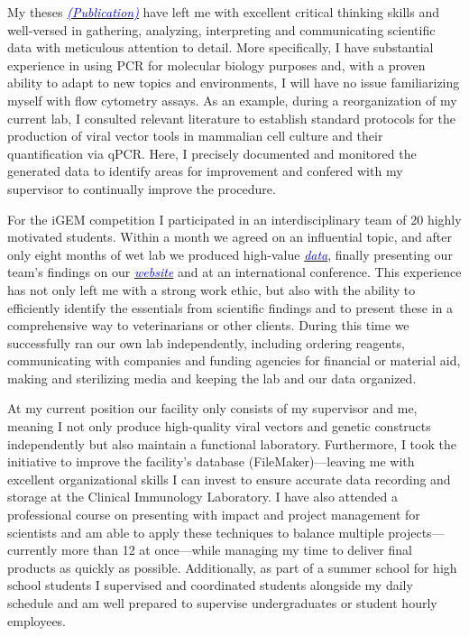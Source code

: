 \documentclass[11pt,a4paper,sans]{moderncv}
\begin{document}
\begin{spacing}{1.1}
My theses {\href{https://www.ncbi.nlm.nih.gov/pubmed/29517395}{\textcolor{blue}{{\textit{(Publication)}}}}} have left me with excellent critical thinking skills and well-versed in gathering, analyzing, interpreting and communicating scientific data with meticulous attention to detail. 
More specifically, I have substantial experience in using PCR for molecular biology purposes and, with a proven ability to adapt to new topics and environments, I will have no issue familiarizing myself with flow cytometry assays. 
As an example, during a reorganization of my current lab, I consulted relevant literature to establish standard protocols for the production of viral vector tools in mammalian cell culture and their quantification via qPCR. 
Here, I precisely documented and monitored the generated data to identify areas for improvement and confered with my supervisor to continually improve the procedure. \par%
For the iGEM competition I participated in an interdisciplinary team of 20 highly motivated students.
Within a month we agreed on an influential topic, and after only eight months of wet lab we produced high-value  {\href{https://www.ncbi.nlm.nih.gov/pubmed/29803867}{\textcolor{blue}{\textit{data}}}}, finally presenting our team's findings on our {\href{http://2015.igem.org/Team:Freiburg}{\textcolor{blue}{\textit{website}}}} and at an international conference. 
This experience has not only left me with a strong work ethic, but also with the ability to efficiently identify the essentials from scientific findings and to present these in a comprehensive way to veterinarians or other clients. 
During this time we successfully ran our own lab independently, including ordering reagents, communicating with companies and funding agencies for financial or material aid, making and sterilizing media and keeping the lab and our data organized. \par 
At my current position our facility only consists of my supervisor and me, meaning I not only produce high-quality viral vectors and genetic constructs independently but also maintain a functional laboratory. 
Furthermore, I took the initiative to improve the facility's database (FileMaker)---leaving me with excellent organizational skills I can invest to ensure accurate data recording and storage at the Clinical Immunology Laboratory.  
I have also attended a professional course on presenting with impact and project management for scientists and am able to apply these techniques to balance multiple projects---currently more than 12 at once---while managing my time to deliver final products as quickly as possible.  
Additionally, as part of a summer school for high school students I supervised and coordinated students alongside my daily schedule and am well prepared to supervise undergraduates or student hourly employees. \par%



\end{spacing}
\end{document}
